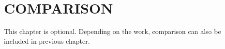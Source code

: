 
\chapter{\uppercase{Comparison}} %
\label{chap6} %
This chapter is optional. Depending on the work, comparison can also be included in previous chapter.

